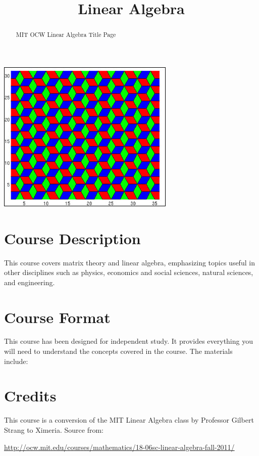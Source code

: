 \documentclass{ximera}
\title{Linear Algebra}
\begin{document}
\begin{abstract}
  MIT OCW Linear Algebra Title Page
\end{abstract}
\maketitle

\begin{image}
\includegraphics{Main.jpg}
\end{image}

\section*{Course Description}

This course covers matrix theory and linear algebra, emphasizing
topics useful in other disciplines such as physics, economics and
social sciences, natural sciences, and engineering.

\section*{Course Format}

This course has been designed for independent study. It provides
everything you will need to understand the concepts covered in the
course. The materials include:

\section*{Credits}
This course is a conversion of the MIT Linear Algebra class by
Professor Gilbert Strang to Ximeria. Source from:


\url{http://ocw.mit.edu/courses/mathematics/18-06sc-linear-algebra-fall-2011/}
\end{document}
